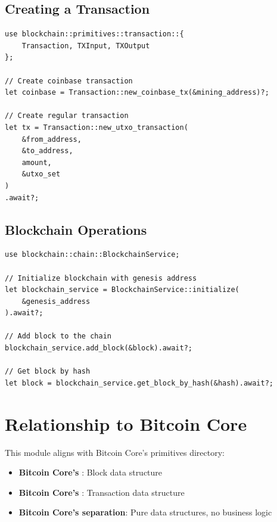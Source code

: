 \subsection{Creating a Transaction}
\label{sec:ch06-create-transaction}

\begin{listing}[H]
\caption{Creating transactions}
\label{lst:ch06-28}
\begin{verbatim}
use blockchain::primitives::transaction::{
    Transaction, TXInput, TXOutput
};

// Create coinbase transaction
let coinbase = Transaction::new_coinbase_tx(&mining_address)?;

// Create regular transaction
let tx = Transaction::new_utxo_transaction(
    &from_address,
    &to_address,
    amount,
    &utxo_set
)
.await?;
\end{verbatim}
\end{listing}

\subsection{Blockchain Operations}
\label{sec:ch06-blockchain-ops}

\begin{listing}[H]
\caption{Basic blockchain operations}
\label{lst:ch06-29}
\begin{verbatim}
use blockchain::chain::BlockchainService;

// Initialize blockchain with genesis address
let blockchain_service = BlockchainService::initialize(
    &genesis_address
).await?;

// Add block to the chain
blockchain_service.add_block(&block).await?;

// Get block by hash
let block = blockchain_service.get_block_by_hash(&hash).await?;
\end{verbatim}
\end{listing}

\section{Relationship to Bitcoin Core}
\label{sec:ch06-bitcoin-core-relation}

This module aligns with Bitcoin Core's primitives directory:

\begin{itemize}
  \item \textbf{Bitcoin Core's }: Block data structure
  \item \textbf{Bitcoin Core's }: Transaction data structure
  \item \textbf{Bitcoin Core's separation}: Pure data structures, no business logic
\end{itemize}


